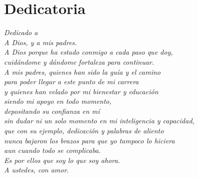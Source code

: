 \chapter*{Dedicatoria}
\begin{flushright}
\textit{Dedicado a\\
A Dios, y a mis padres.\\
A Dios porque ha estado conmigo a cada paso que doy, \\
cuid\'andome y d\'andome fortaleza para continuar.\\
A mis padres, quienes han sido la gu\'ia y el camino\\
para poder llegar a este punto de mi carrera\\ 
y quienes han velado por mi bienestar y educaci\'on\\ 
siendo mi apoyo en todo momento,\\ 
depositando su confianza en m\'i\\ 
sin dudar ni un solo momento en mi inteligencia y capacidad,\\ 
que con su ejemplo, dedicaci\'on y palabras de aliento\\ 
nunca bajaron los brazos para que yo tampoco lo hiciera\\ 
aun cuando todo se complicaba.\\
Es por ellos que soy lo que soy ahora.\\
A ustedes, con amor.}
\end{flushright}